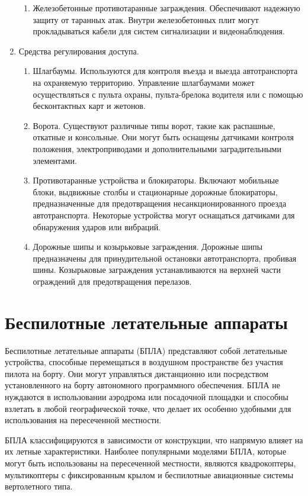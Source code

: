\begin{enumerate}
\begin{enumerate}
        \item Железобетонные противотаранные заграждения. Обеспечивают надежную защиту от таранных атак. Внутри железобетонных плит могут прокладываться кабели для систем сигнализации и видеонаблюдения.
    \end{enumerate}
    \item Средства регулирования доступа.
    \begin{enumerate}
        \item Шлагбаумы. Используются для контроля въезда и выезда автотранспорта на охраняемую территорию. Управление шлагбаумами может осуществляться с пульта охраны, пульта-брелока водителя или с помощью бесконтактных карт и жетонов.
        \item Ворота. Существуют различные типы ворот, такие как распашные, откатные и консольные. Они могут быть оснащены датчиками контроля положения, электроприводами и дополнительными заградительными элементами.
        \item Противотаранные устройства и блокираторы. Включают мобильные блоки, выдвижные столбы и стационарные дорожные блокираторы, предназначенные для предотвращения несанкционированного проезда автотранспорта. Некоторые устройства могут оснащаться датчиками для обнаружения ударов или вибраций.
        \item Дорожные шипы и козырьковые заграждения. Дорожные шипы предназначены для принудительной остановки автотранспорта, пробивая шины. Козырьковые заграждения устанавливаются на верхней части ограждений для предотвращения перелазов.
    \end{enumerate}
\end{enumerate}

\section{Беспилотные летательные аппараты}
Беспилотные летательные аппараты (БПЛА) представляют собой летательные устройства, способные перемещаться в воздушном пространстве без участия пилота на борту. Они могут управляться дистанционно или посредством установленного на борту автономного программного обеспечения. БПЛА не нуждаются в использовании аэродрома или посадочной площадки и способны взлетать в любой географической точке, что делает их особенно удобными для использования на пересеченной местности.

БПЛА классифицируются в зависимости от конструкции, что напрямую влияет на их летные характеристики. Наиболее популярными моделями БПЛА, которые могут быть использованы на пересеченной местности, являются квадрокоптеры, мультикоптеры с фиксированным крылом и беспилотные авиационные системы вертолетного типа. 


